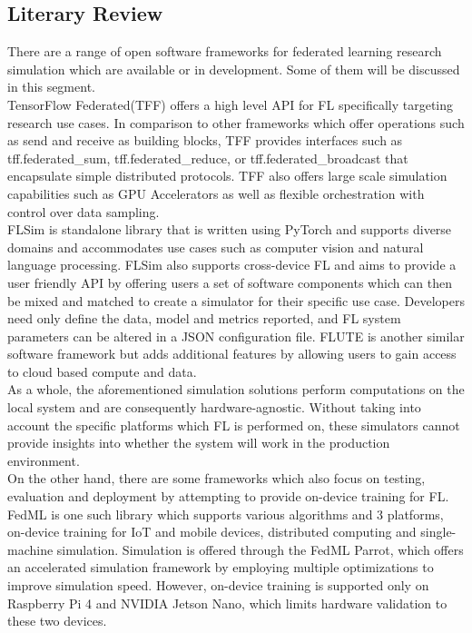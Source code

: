 \documentclass[12pt]{article}
\begin{document}
\subsection{Literary Review}
There are a range of open software frameworks for federated learning research simulation which are
available or in development. Some of them will be discussed in this segment.\\

TensorFlow Federated(TFF)\cite{tff} offers a high level API for FL specifically targeting research use
cases. In comparison to other frameworks which offer operations such as send and receive as building
blocks, TFF provides interfaces such as tff.federated\_sum, tff.federated\_reduce, or
tff.federated\_broadcast that encapsulate simple distributed protocols. TFF also offers large scale
simulation capabilities such as GPU Accelerators as well as flexible orchestration with control over
data sampling.\\

FLSim\cite{li_2021_flsim} is standalone library that is written using PyTorch\cite{paszke2019pytorch} and supports diverse
domains and accommodates use cases such as computer vision and natural language processing. FLSim
also supports cross-device FL and aims to provide a user friendly API by offering users a set
of software components which can then be mixed and matched to create a simulator for their specific use case. Developers need only
define the data, model and metrics reported, and FL system parameters can be altered in a JSON\cite{json}
configuration file. FLUTE\cite{garcia_2022_flute} is another similar software framework but adds additional features by allowing users to gain access to cloud based
compute and data.\\

As a whole, the aforementioned simulation solutions perform computations on the local system and are consequently hardware-agnostic. Without
taking into account the specific platforms which FL is performed on, these simulators cannot provide
insights into whether the system will work in the production environment.\\

On the other hand, there are some frameworks which also focus on testing, evaluation and deployment by
attempting to provide on-device training for FL.
FedML\cite{he_2020_fedml} is one such library which supports various algorithms and 3 platforms, on-device training for IoT and
mobile devices, distributed computing and single-machine simulation.
Simulation is offered through the FedML Parrot\cite{tang_2023_fedml}, which offers an accelerated simulation
framework by employing multiple optimizations to improve simulation speed.
However, on-device training is supported only on Raspberry Pi 4 and NVIDIA Jetson Nano, which limits
hardware validation to these two devices.\\
\end{document}
